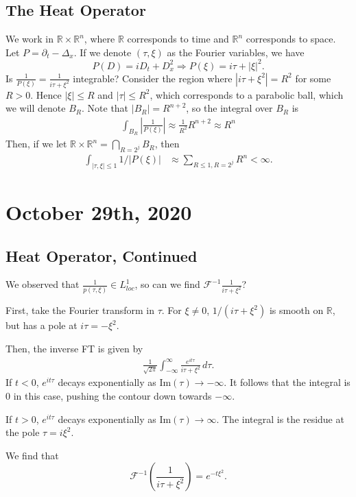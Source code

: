 \documentclass[12pt]{scrartcl}
\newcommand{\R}{\mathbb{R}}
\begin{document}
\subsection{The Heat Operator}
We work in $\R \times \R^n$, where $\R$ corresponds to time and $\R^n$ corresponds to space.  Let $P = \partial_t - \Delta_x$.  If we denote $(\tau, \xi)$ as the Fourier variables, we have 
$$P(D) = i D_t + D_x^2 \Longrightarrow P(\xi) = i\tau + |\xi|^2.$$
Is $\frac{1}{P(\xi)} = \frac{1}{i\tau + \xi^2}$ integrable?  Consider the region where $|i\tau + \xi^2| = R^2$ for some $R > 0$. Hence $|\xi| \le R$ and $|\tau| \le R^2$, which corresponds to a parabolic ball, which we will denote $B_R$.  Note that $|B_R| = R^{n+2}$, so the integral over $B_R$ is 
\begin{align*}
\int_{B_R} \left |\frac{1}{P(\xi)}\right | \approx \frac{1}{R^2} R^{n+2} \approx R^n
\end{align*} 
Then, if we let $\R \times \R^n = \bigcap_{R = 2^j} B_R$, then 
\begin{align*}
\int_{|\tau, \xi| \le 1} 1/|P(\xi)| &\approx \sum_{R \le 1, R = 2^j} R^n < \infty.
\end{align*}
\pagebreak
\section{October 29th, 2020}
\subsection{Heat Operator, Continued}
We observed that $\frac{1}{p(\tau, \xi)} \in L^1_{loc}$, so can we find $\mathcal F^{-1} \frac{1}{i\tau + \xi^2}$?

First, take the Fourier transform in $\tau$.  For $\xi \ne 0$, $1/(i\tau + \xi^2)$ is smooth on $\R$, but has a pole at $i\tau = -\xi^2$.  

Then, the inverse FT is given by
\begin{align*}
\frac{1}{\sqrt{2\pi}}\int_{-\infty}^\infty \frac{e^{it\tau}}{i\tau + \xi^2} \, d\tau.
\end{align*}
If $t < 0$, $e^{it\tau}$ decays exponentially as $\text{Im}(\tau) \to -\infty$.  It follows that the integral is $0$ in this case, pushing the contour down towards $-\infty$.

If $t > 0$, $e^{it\tau}$ decays exponentially as $\text{Im}(\tau) \to \infty$.  The integral is the residue at the pole $\tau = i\xi^2$.  

We find that 
$$\mathcal F^{-1}\left (\frac{1}{i\tau + \xi^2}\right) = e^{-t\xi^2}.$$
\end{document}
